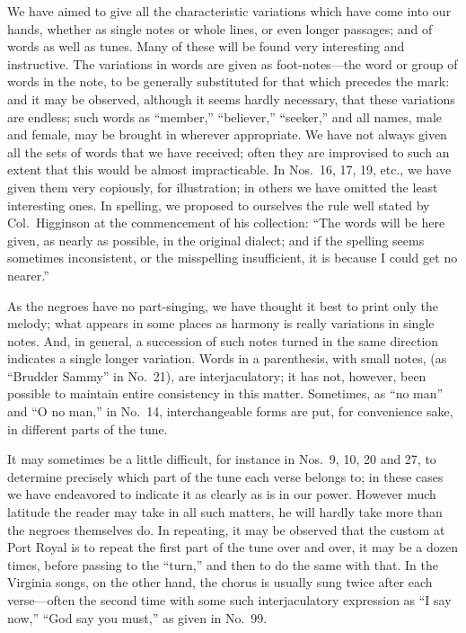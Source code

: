 \documentclass[a5paper,10pt]{book}
\begin{document}
We have aimed to give all the characteristic variations which have
come into our hands, whether as single notes or whole lines, or even
longer passages; and of words as well as tunes.  Many of these will be
found very interesting and instructive.  The variations in words are
given as foot-notes---the word or group of words in the note, to be
generally substituted for that which precedes the mark: and it may be
observed, although it seems hardly necessary, that these variations
are endless; such words as ``member,'' ``believer,'' ``seeker,'' and
all names, male and female, may be brought in wherever appropriate.
We have not always given all the sets of words that we have received;
often they are improvised to such an extent that this would be almost
impracticable.  In Nos.~16, 17, 19, etc., we have given them very
copiously, for illustration; in others we have omitted the least
interesting ones.  In spelling, we proposed to ourselves the rule well
stated by Col.~Higginson at the commencement of his collection: ``The
words will be here given, as nearly as possible, in the original
dialect; and if the spelling seems sometimes inconsistent, or the
misspelling insufficient, it is because I could get no nearer.''

As the negroes have no part-singing, we have thought it best to print
only the melody; what appears in some places as harmony is really
variations in single notes.  And, in general, a succession of such
notes turned in the same direction indicates a single longer
variation.  Words in a parenthesis, with small notes, (as ``Brudder
Sammy'' in No.~21), are interjaculatory; it has not, however, been
possible to maintain entire consistency in this matter.  Sometimes, as
``no man'' and ``O no man,'' in No.~14, interchangeable forms are put,
for convenience sake, in different parts of the tune.

It may sometimes be a little difficult, for instance in Nos.~9, 10, 20
and 27, to determine precisely which part of the tune each verse
belongs to; in these cases we have endeavored to indicate it as
clearly as is in our power.  However much latitude the reader may take
in all such matters, he will hardly take more than the negroes
themselves do.  In repeating, it may be observed that the custom at
Port Royal is to repeat the first part of the tune over and over, it
may be a dozen times, before passing to the ``turn,'' and then to do
the same with that.  In the Virginia songs, on the other hand, the
chorus is usually sung twice after each verse---often the second time
with some such interjaculatory expression as ``I say now,'' ``God say
you must,'' as given in No.~99.
\end{document}
